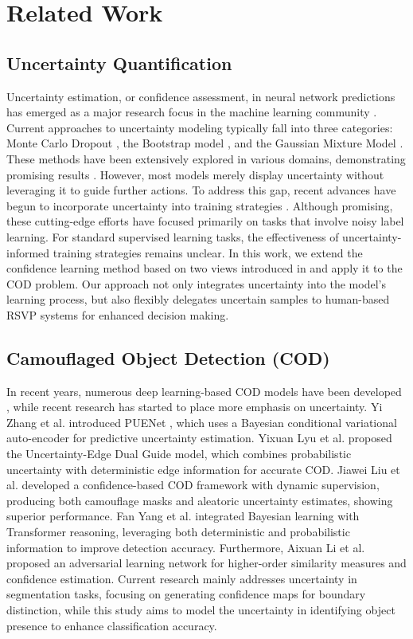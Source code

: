 \section{Related Work}
\subsection{Uncertainty Quantification}
Uncertainty estimation, or confidence assessment, in neural network predictions has emerged as a major research focus in the machine learning community \cite{smith2024uncertainty}. Current approaches to uncertainty modeling typically fall into three categories: Monte Carlo Dropout \cite{neal2012bayesian, Moreau_2022_WACV, gal2017concrete, kang2023active}, the Bootstrap model \cite{osband2016deep}, and the Gaussian Mixture Model \cite{9666964, zhang2019short}. These methods have been extensively explored in various domains, demonstrating promising results \cite{abdar2021review}. However, most models merely display uncertainty without leveraging it to guide further actions. To address this gap, recent advances have begun to incorporate uncertainty into training strategies \cite{li2023disc,cordeiro2023longremix}. Although promising, these cutting-edge efforts have focused primarily on tasks that involve noisy label learning. For standard supervised learning tasks, the effectiveness of uncertainty-informed training strategies remains unclear. In this work, we extend the confidence learning method based on two views introduced in \cite{li2023disc} and apply it to the COD problem. Our approach not only integrates uncertainty into the model's learning process, but also flexibly delegates uncertain samples to human-based RSVP systems for enhanced decision making.

\subsection{Camouflaged Object Detection (COD)}
In recent years, numerous deep learning-based COD models have been developed \cite{liang2024systematic}, while recent research has started to place more emphasis on uncertainty. Yi Zhang et al. introduced PUENet \cite{10159663}, which uses a Bayesian conditional variational auto-encoder for predictive uncertainty estimation. Yixuan Lyu et al. \cite{10183371} proposed the Uncertainty-Edge Dual Guide model, which combines probabilistic uncertainty with deterministic edge information for accurate COD. Jiawei Liu et al. \cite{9706783} developed a confidence-based COD framework with dynamic supervision, producing both camouflage masks and aleatoric uncertainty estimates, showing superior performance. Fan Yang et al. \cite{9710683} integrated Bayesian learning with Transformer reasoning, leveraging both deterministic and probabilistic information to improve detection accuracy. Furthermore, Aixuan Li et al. \cite{9578707} proposed an adversarial learning network for higher-order similarity measures and confidence estimation. Current research mainly addresses uncertainty in segmentation tasks, focusing on generating confidence maps for boundary distinction, while this study aims to model the uncertainty in identifying object presence to enhance classification accuracy.

